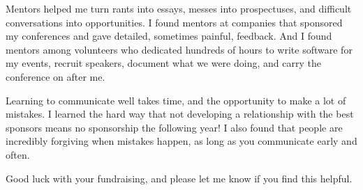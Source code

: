 Mentors helped me turn rants into essays, messes into prospectuses, and difficult conversations into opportunities. I found mentors at companies that sponsored my conferences and gave detailed, sometimes painful, feedback. And I found mentors among volunteers who dedicated hundreds of hours to write software for my events, recruit speakers, document what we were doing, and carry the conference on after me. 

Learning to communicate well takes time, and the opportunity to make a lot of mistakes. I learned the hard way that not developing a relationship with the best sponsors means no sponsorship the following year! I also found that people are incredibly forgiving when mistakes happen, as long as you communicate early and often.

Good luck with your fundraising, and please let me know if you find this helpful.
